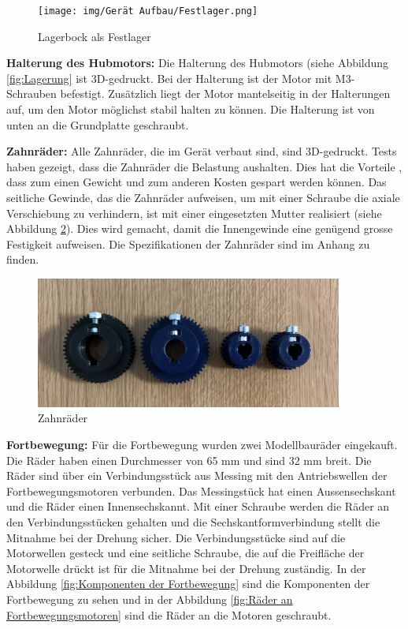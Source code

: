 \begin{figure}[H]
  \texttt{[image: img/Gerät Aufbau/Festlager.png]}
  \centering
  \caption{Lagerbock als Festlager}
  \label{fig:Festlager}
\end{figure}

\newpage

\textbf{Halterung des Hubmotors:} Die Halterung des Hubmotors (siehe Abbildung \ref{fig:Lagerung} ist 3D-gedruckt. Bei der Halterung ist der Motor mit M3-Schrauben befestigt. Zusätzlich liegt der Motor mantelseitig in der Halterungen auf, um den Motor möglichst stabil halten zu können. Die Halterung ist von unten an die Grundplatte geschraubt.

\textbf{Zahnräder:} Alle Zahnräder, die im Gerät verbaut sind, sind 3D-gedruckt. Tests haben gezeigt, dass die Zahnräder die Belastung aushalten. Dies hat die Vorteile , dass zum einen Gewicht und zum anderen Kosten gespart werden können. Das seitliche Gewinde, das die Zahnräder aufweisen, um mit einer Schraube die axiale Verschiebung zu verhindern, ist mit einer eingesetzten Mutter realisiert (siehe Abbildung \ref{fig:Zahnräder}). Dies wird gemacht, damit die Innengewinde eine genügend grosse Festigkeit aufweisen. Die Spezifikationen der Zahnräder sind im Anhang  %
zu finden.

\begin{figure}[H]
  \includegraphics[width=0.9\textwidth]{img/Gerät Aufbau/Zahnräder.png}
  \centering
  \caption{Zahnräder}
  \label{fig:Zahnräder}
\end{figure}

\textbf{Fortbewegung:} Für die Fortbewegung wurden zwei Modellbauräder eingekauft. Die Räder haben einen Durchmesser von 65 mm und sind 32 mm breit. Die Räder sind über ein Verbindungsstück aus Messing mit den Antriebswellen der Fortbewegungsmotoren verbunden. Das Messingstück hat einen Aussensechskant und die Räder einen Innensechskannt. Mit einer Schraube werden die Räder an den Verbindungsstücken gehalten und die Sechskantformverbindung stellt die Mitnahme bei der Drehung sicher. Die Verbindungsstücke sind auf die Motorwellen gesteck und eine seitliche Schraube, die auf die Freifläche der Motorwelle drückt ist für die Mitnahme bei der Drehung zuständig. In der Abbildung \ref{fig:Komponenten der Fortbewegung} sind die Komponenten der Fortbewegung zu sehen und in der Abbildung \ref{fig:Räder an Fortbewegungsmotoren} sind die Räder an die Motoren geschraubt.

